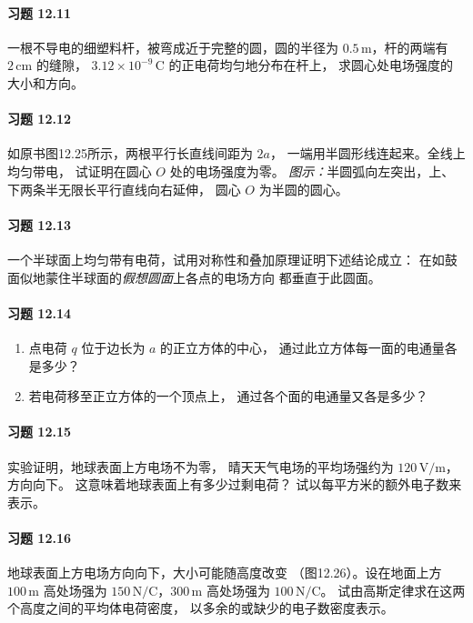 \paragraph{习题 12.11}
一根不导电的细塑料杆，被弯成近于完整的圆，圆的半径为
\(0.5\,\mathrm m\)，杆的两端有 \(2\,\mathrm{cm}\) 的缝隙，
\(3.12\times10^{-9}\,\mathrm C\) 的正电荷均匀地分布在杆上，
求圆心处电场强度的大小和方向。

\paragraph{习题 12.12}
如原书图12.25所示，两根平行长直线间距为 \(2a\)，
一端用半圆形线连起来。全线上均匀带电，
试证明在圆心 \(O\) 处的电场强度为零。
\textit{图示：}半圆弧向左突出，上、下两条半无限长平行直线向右延伸，
圆心 \(O\) 为半圆的圆心。

\paragraph{习题 12.13}
一个半球面上均匀带有电荷，试用对称性和叠加原理证明下述结论成立：
在如鼓面似地蒙住半球面的\emph{假想圆面}上各点的电场方向
都垂直于此圆面。

\paragraph{习题 12.14}
\begin{enumerate}
\item 点电荷 \(q\) 位于边长为 \(a\) 的正立方体的中心，
通过此立方体每一面的电通量各是多少？
\item 若电荷移至正立方体的一个顶点上，
通过各个面的电通量又各是多少？
\end{enumerate}

\paragraph{习题 12.15}
实验证明，地球表面上方电场不为零，
晴天天气电场的平均场强约为 \(120\,\mathrm{V/m}\)，方向向下。
这意味着地球表面上有多少过剩电荷？
试以每平方米的额外电子数来表示。

\paragraph{习题 12.16}
地球表面上方电场方向向下，大小可能随高度改变
（图12.26）。设在地面上方 \(100\,\mathrm m\) 高处场强为
\(150\,\mathrm{N/C}\)，\(300\,\mathrm m\) 高处场强为
\(100\,\mathrm{N/C}\)。
试由高斯定律求在这两个高度之间的平均体电荷密度，
以多余的或缺少的电子数密度表示。

